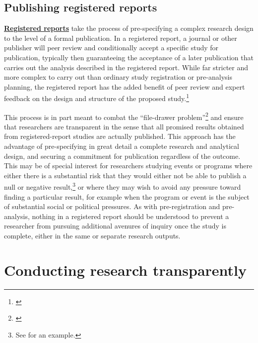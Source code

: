 \documentclass[]{tufte-book}
\begin{document}
\hypertarget{publishing-registered-reports}{%
\subsection*{Publishing registered
reports}\label{publishing-registered-reports}}

\href{https://dimewiki.worldbank.org/Registered_Reports}{\textbf{Registered
reports}} take the process of pre-specifying a
complex research design to the level of a formal publication. In a
registered report, a journal or other publisher will peer review and
conditionally accept a specific study for publication, typically then
guaranteeing the acceptance of a later publication that carries out the
analysis described in the registered report. While far stricter and more
complex to carry out than ordinary study registration or pre-analysis
planning, the registered report has the added benefit of peer review and
expert feedback on the design and structure of the proposed
study.\footnote{\href{https://blogs.worldbank.org/impactevaluations/registered-reports-piloting-pre-results-review-process-journal-development-economics}{}}

This process is in part meant to combat the ``file-drawer
problem''\footnote{\cite{@simonsohn2014p}}
and ensure that researchers are transparent in the sense that all
promised results obtained from registered-report studies are actually
published. This approach has the advantage of pre-specifying in great
detail a complete research and analytical design, and securing a
commitment for publication regardless of the outcome. This may be of
special interest for researchers studying events or programs where
either there is a substantial risk that they would either not be able to
publish a null or negative result,\footnote{See
  \cite{@coville2019nollywood} for an example.} or
where they may wish to avoid any pressure toward finding a particular
result, for example when the program or event is the subject of
substantial social or political pressures. As with pre-registration and
pre-analysis, nothing in a registered report should be understood to
prevent a researcher from pursuing additional avenures of inquiry once
the study is complete, either in the same or separate research outputs.

\hypertarget{conducting-research-transparently}{%
\section*{Conducting research
transparently}\label{conducting-research-transparently}}
\end{document}
